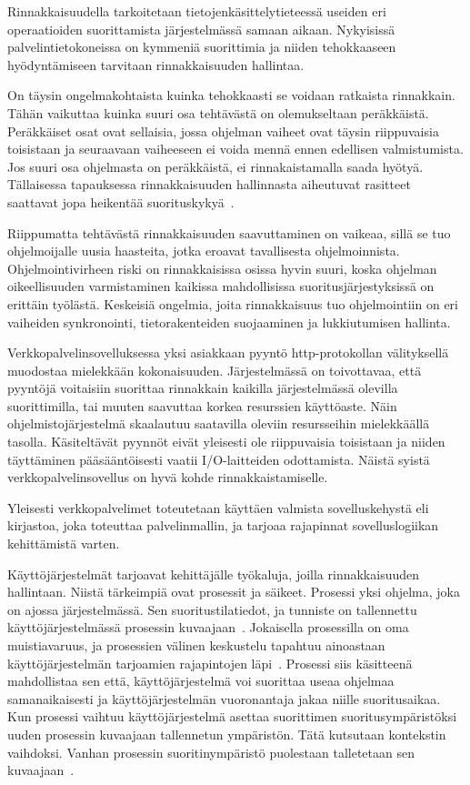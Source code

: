 \documentclass[finnish]{tktltiki2}
\theoremstyle{definition}
\theoremstyle{remark}
\begin{document}
Rinnakkaisuudella tarkoitetaan tietojenkäsittelytieteessä useiden
eri operaatioiden suorittamista järjestelmässä samaan aikaan.
Nykyisissä palvelintietokoneissa on kymmeniä suorittimia ja niiden tehokkaaseen
hyödyntämiseen tarvitaan rinnakkaisuuden hallintaa.

On täysin ongelmakohtaista kuinka tehokkaasti se voidaan ratkaista rinnakkain.
Tähän vaikuttaa kuinka suuri osa tehtävästä on olemukseltaan peräkkäistä.
Peräkkäiset osat ovat sellaisia, jossa ohjelman vaiheet ovat täysin
riippuvaisia toisistaan ja seuraavaan vaiheeseen ei voida mennä ennen edellisen
valmistumista. Jos suuri osa ohjelmasta on peräkkäistä, ei rinnakaistamalla
saada hyötyä. Tällaisessa tapauksessa rinnakkaisuuden hallinnasta aiheutuvat
rasitteet saattavat jopa heikentää suorituskykyä~\cite{stallings_operating_2018}.

Riippumatta tehtävästä rinnakkaisuuden saavuttaminen on vaikeaa,
sillä se tuo ohjelmoijalle uusia haasteita, jotka eroavat tavallisesta
ohjelmoinnista. Ohjelmointivirheen riski on rinnakkaisissa osissa hyvin suuri,
koska ohjelman oikeellisuuden varmistaminen kaikissa mahdollisissa
suoritusjärjestyksissä on erittäin työlästä.
Keskeisiä ongelmia, joita rinnakkaisuus tuo ohjelmointiin on eri vaiheiden
synkronointi, tietorakenteiden suojaaminen ja lukkiutumisen hallinta.

Verkkopalvelinsovelluksessa yksi asiakkaan pyyntö http-protokollan välityksellä
muodostaa mielekkään kokonaisuuden.
Järjestelmässä on toivottavaa, että pyyntöjä voitaisiin suorittaa
rinnakkain kaikilla järjestelmässä olevilla suorittimilla, tai muuten
saavuttaa korkea resurssien käyttöaste.
Näin ohjelmistojärjestelmä skaalautuu saatavilla oleviin resursseihin
mielekkäällä tasolla. Käsiteltävät pyynnöt eivät yleisesti ole riippuvaisia
toisistaan ja niiden täyttäminen pääsääntöisesti vaatii I/O-laitteiden odottamista.
Näistä syistä verkkopalvelinsovellus on hyvä kohde rinnakkaistamiselle.

Yleisesti verkkopalvelimet toteutetaan käyttäen valmista sovelluskehystä eli kirjastoa,
joka toteuttaa palvelinmallin, ja tarjoaa rajapinnat sovelluslogiikan
kehittämistä varten.

Käyttöjärjestelmät tarjoavat kehittäjälle työkaluja, joilla rinnakkaisuuden hallintaan.
Niistä tärkeimpiä ovat prosessit ja säikeet.
Prosessi yksi ohjelma, joka on ajossa järjestelmässä. Sen suoritustilatiedot, ja tunniste on
tallennettu käyttöjärjestelmässä prosessin kuvaajaan~\cite{stallings_operating_2018}.
Jokaisella
prosessilla on oma muistiavaruus, ja prosessien välinen keskustelu
tapahtuu ainoastaan käyttöjärjestelmän tarjoamien rajapintojen läpi~\cite{stallings_operating_2018}.
Prosessi siis käsitteenä mahdollistaa sen että, käyttöjärjestelmä
voi suorittaa useaa ohjelmaa samanaikaisesti ja käyttöjärjestelmän
vuoronantaja jakaa niille suoritusaikaa. Kun prosessi vaihtuu
käyttöjärjestelmä asettaa suorittimen suoritusympäristöksi
uuden prosessin kuvaajaan tallennetun ympäristön. Tätä kutsutaan kontekstin
vaihdoksi. Vanhan prosessin suoritinympäristö puolestaan talletetaan sen
kuvaajaan~\cite{stallings_operating_2018}.
\end{document}

